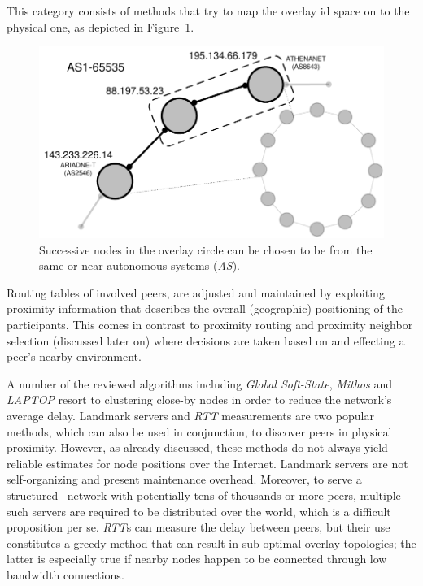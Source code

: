 This category consists of methods that try to map the overlay id space on to
the physical one, as depicted in Figure~\ref{figure:geographic-layout}.
\begin{figure}[ht]
\centering
  \includegraphics[scale=0.44]{img/pdf/geographic-layout.pdf}
\caption{Successive nodes in the overlay circle can be chosen to be from the
same or near autonomous systems (\emph{AS}).}
\label{figure:geographic-layout}
\end{figure}
Routing tables of involved peers, are adjusted and maintained by exploiting
proximity information that describes the overall (geographic) positioning of
the participants. This comes in contrast to proximity routing and proximity neighbor
selection (discussed later on) where decisions are taken based on and effecting
a peer's nearby environment.

A number of the reviewed algorithms including 
\emph{Global Soft-State},
\emph{Mithos} and \emph{LAPTOP} resort to clustering close-by nodes in
order to reduce the network's average delay.
Landmark servers and \emph{RTT} measurements are two popular methods, which
can also be used in conjunction, to discover peers in physical proximity.
However, as already discussed, these
methods do not always yield reliable estimates for node positions over the
Internet. 
Landmark servers are not self-organizing and present maintenance
overhead. Moreover, to serve a structured \p--network with potentially 
tens of thousands or more 
peers, multiple such servers are required to be distributed over the world, 
which is a difficult proposition per se.
\emph{RTT}s can measure the delay between peers, but their use constitutes a
greedy method that can result in sub-optimal overlay topologies;
the latter is especially true if nearby 
nodes happen to be connected through low bandwidth connections.

